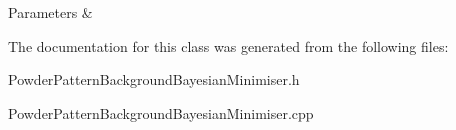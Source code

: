 \begin{DoxyParams}{Parameters}
{\em } & \\
\hline
\end{DoxyParams}


The documentation for this class was generated from the following files\+:\begin{DoxyCompactItemize}
\item 
Powder\+Pattern\+Background\+Bayesian\+Minimiser.\+h\item 
Powder\+Pattern\+Background\+Bayesian\+Minimiser.\+cpp\end{DoxyCompactItemize}
